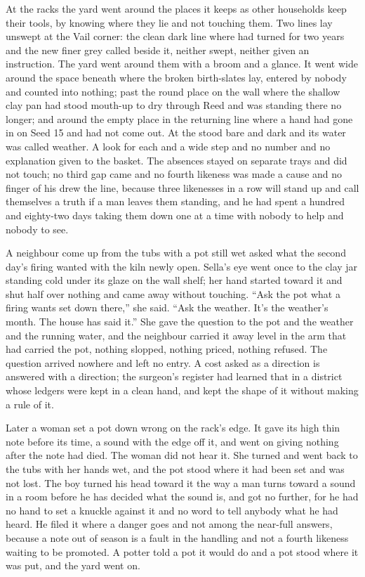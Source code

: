 At the racks the yard went around the places it keeps as other households keep their tools, by knowing where they lie and not touching them. Two lines lay unswept at the Vail corner: the clean dark line where  had turned for two years and the new finer grey called  beside it, neither swept, neither given an instruction. The yard went around them with a broom and a glance. It went wide around the space beneath  where the broken birth-slates lay, entered by nobody and counted into nothing; past the round place on the wall where the shallow clay pan had stood mouth-up to dry through Reed and was standing there no longer; and around the empty place in the returning line where a hand had gone in on Seed 15 and had not come out. At  the  stood bare and dark and its water was called weather. A look for each and a wide step and no number and no explanation given to the basket. The absences stayed on separate trays and did not touch; no third gap came and no fourth likeness was made a cause and no finger of his drew the line, because three likenesses in a row will stand up and call themselves a truth if a man leaves them standing, and he had spent a hundred and eighty-two days taking them down one at a time with nobody to help and nobody to see.

A neighbour come up from the tubs with a pot still wet asked what the second day's firing wanted with the kiln newly open. Sella's eye went once to the clay jar standing cold under its glaze on the wall shelf; her hand started toward it and shut half over nothing and came away without touching. “Ask the pot what a firing wants set down there,” she said. “Ask the weather. It's the weather's month. The house has said it.” She gave the question to the pot and the weather and the running water, and the neighbour carried it away level in the arm that had carried the pot, nothing slopped, nothing priced, nothing refused. The question arrived nowhere and left no entry. A cost asked as a direction is answered with a direction; the surgeon's register had learned that in a district whose ledgers were kept in a clean hand, and kept the shape of it without making a rule of it.

Later a woman set a pot down wrong on the rack's edge. It gave its high thin note before its time, a sound with the edge off it, and went on giving nothing after the note had died. The woman did not hear it. She turned and went back to the tubs with her hands wet, and the pot stood where it had been set and was not lost. The boy turned his head toward it the way a man turns toward a sound in a room before he has decided what the sound is, and got no further, for he had no hand to set a knuckle against it and no word to tell anybody what he had heard. He filed it where a danger goes and not among the near-full answers, because a note out of season is a fault in the handling and not a fourth likeness waiting to be promoted. A potter told a pot it would do and a pot stood where it was put, and the yard went on.

